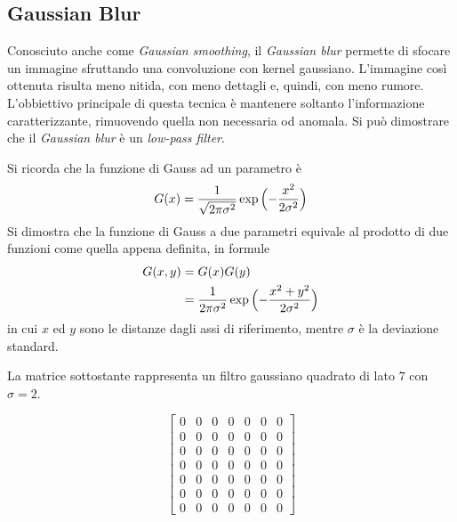 
\clearpage
\subsection {Gaussian Blur}
Conosciuto anche come \textit{Gaussian smoothing}, il \textit{Gaussian blur} permette di sfocare un immagine sfruttando una convoluzione con kernel gaussiano.
L'immagine così ottenuta risulta meno nitida, con meno dettagli e, quindi, con meno rumore.
L'obbiettivo principale di questa tecnica è mantenere soltanto l'informazione caratterizzante, rimuovendo quella non necessaria od anomala.
Si può dimostrare che il \textit{Gaussian blur} è un \textit{low-pass filter}.

Si ricorda che la funzione di Gauss ad un parametro è
\begin{equation*}
  G(x) = \frac{1}{\sqrt{2\pi\sigma^2}}
         \exp{\Bigl(- \frac{ x^2 }{ 2 \sigma^2 } \Bigr)} 
\end{equation*}
Si dimostra che la funzione di Gauss a due parametri equivale al prodotto di due funzioni come quella appena definita, in formule
\begin{equation}
  \begin{split}
    G(x,y) & = G(x)G(y) \\
           & = \frac{1}{2\pi\sigma^2}
               \exp{\Bigl(- \frac{ x^2 + y^2 }{ 2 \sigma^2 } \Bigr)} 
  \end{split}
\end{equation}
in cui $x$ ed $y$ sono le distanze dagli assi di riferimento, mentre $\sigma$ è la deviazione standard.
% 
% 

La matrice sottostante rappresenta un filtro gaussiano quadrato di lato $7$ con $\sigma = 2$.

\begin{equation*} %
  \begin{bmatrix}
    0&0&0&0&0&0&0\\
    0&0&0&0&0&0&0\\
    0&0&0&0&0&0&0\\
    0&0&0&0&0&0&0\\
    0&0&0&0&0&0&0\\
    0&0&0&0&0&0&0\\
    0&0&0&0&0&0&0
  \end{bmatrix}
\end{equation*}


